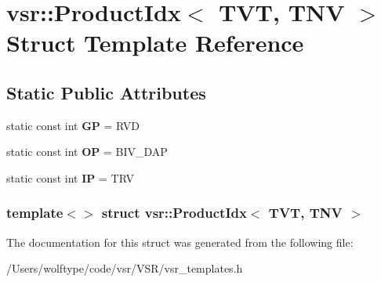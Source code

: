 \hypertarget{structvsr_1_1_product_idx_3_01_t_v_t_00_01_t_n_v_01_4}{\section{vsr\-:\-:Product\-Idx$<$ T\-V\-T, T\-N\-V $>$ Struct Template Reference}
\label{structvsr_1_1_product_idx_3_01_t_v_t_00_01_t_n_v_01_4}
}
\subsection*{Static Public Attributes}
\begin{DoxyCompactItemize}
\item 
\hypertarget{structvsr_1_1_product_idx_3_01_t_v_t_00_01_t_n_v_01_4_a8dc50e71229f8438294a17a69088d15f}{static const int {\bfseries G\-P} = R\-V\-D}\label{structvsr_1_1_product_idx_3_01_t_v_t_00_01_t_n_v_01_4_a8dc50e71229f8438294a17a69088d15f}

\item 
\hypertarget{structvsr_1_1_product_idx_3_01_t_v_t_00_01_t_n_v_01_4_a1ebb239157322dfd6ed9e6b4f3eff6c5}{static const int {\bfseries O\-P} = B\-I\-V\-\_\-\-D\-A\-P}\label{structvsr_1_1_product_idx_3_01_t_v_t_00_01_t_n_v_01_4_a1ebb239157322dfd6ed9e6b4f3eff6c5}

\item 
\hypertarget{structvsr_1_1_product_idx_3_01_t_v_t_00_01_t_n_v_01_4_afb1911ef488a504b10a087be2d8f5a0e}{static const int {\bfseries I\-P} = T\-R\-V}\label{structvsr_1_1_product_idx_3_01_t_v_t_00_01_t_n_v_01_4_afb1911ef488a504b10a087be2d8f5a0e}

\end{DoxyCompactItemize}
\subsubsection*{template$<$$>$ struct vsr\-::\-Product\-Idx$<$ T\-V\-T, T\-N\-V $>$}



The documentation for this struct was generated from the following file\-:\begin{DoxyCompactItemize}
\item 
/\-Users/wolftype/code/vsr/\-V\-S\-R/vsr\-\_\-templates.\-h\end{DoxyCompactItemize}
